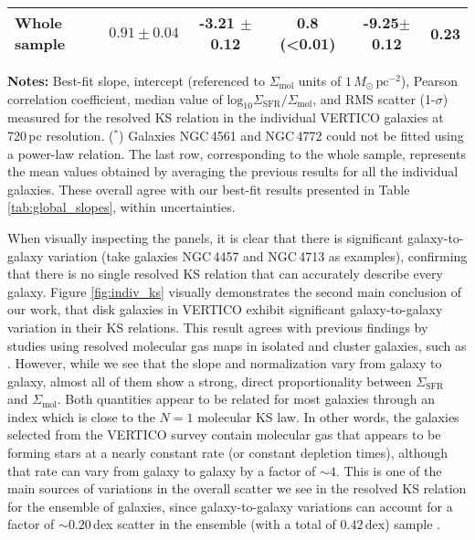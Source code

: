 \documentclass[longauth]{aa}
\begin{document}
\begin{table*}
\begin{tabular}{lccccc}
\hline
Whole sample & $0.91\pm0.04$ & -3.21 $\pm$ 0.12 & 0.8 (<0.01) & -9.25$\pm$0.12 & 0.23 \\
\hline
\end{tabular}
\begin{minipage}{2.0\columnwidth}
    \vspace{1mm}
    {\bf Notes:} Best-fit slope, intercept (referenced to $\Sigma_\mathrm{mol}$ units of $1\,M_\odot\,\mathrm{pc}^{-2}$), Pearson correlation coefficient, median value of $\mathrm{log}_{10} \Sigma_\mathrm{SFR}/\Sigma_\mathrm{mol}$, and RMS scatter (1-$\sigma$) measured for the resolved KS relation in the individual VERTICO galaxies at 720\,pc resolution. ($^{*}$) Galaxies NGC\,4561 and NGC\,4772 could not be fitted using a power-law relation. The last row, corresponding to the whole sample, represents the mean values obtained by averaging the previous results for all the individual galaxies. These overall agree with our best-fit results presented in Table \ref{tab:global_slopes}, within uncertainties.
\end{minipage}
\label{tab:indiv_slopes}
\end{table*}

When visually inspecting the panels, it is clear that there is significant galaxy-to-galaxy variation (take galaxies NGC\,4457 and NGC\,4713 as examples), confirming that there is no single resolved KS relation that can accurately describe every galaxy. Figure \ref{fig:indiv_ks} visually demonstrates the second main conclusion of our work, that disk galaxies in VERTICO exhibit significant galaxy-to-galaxy variation in their KS relations. This result agrees with previous findings by studies using resolved molecular gas maps in isolated and cluster galaxies, such as \citet{Bigiel2008,Shetty2013,Shetty2014,Ellison2020,Zabel2020,Ellison2021}. However, while we see that the slope and normalization vary from galaxy to galaxy, almost all of them show a strong, direct proportionality between $\Sigma_\textrm{SFR}$ and $\Sigma_\textrm{mol}$. Both quantities appear to be related for most galaxies through an index which is close to the $N=1$ molecular KS law. In other words, the galaxies selected from the VERTICO survey contain molecular gas that appears to be forming stars at a nearly constant rate (or constant depletion times), although that rate can vary from galaxy to galaxy by a factor of $\sim 4$. This is one of the main sources of variations in the overall scatter we see in the resolved KS relation for the ensemble of galaxies, since galaxy-to-galaxy variations can account for a factor of $\sim 0.20$\,dex scatter in the ensemble (with a total of $0.42$\,dex) sample \citep{Ellison2021}.
\end{document}
